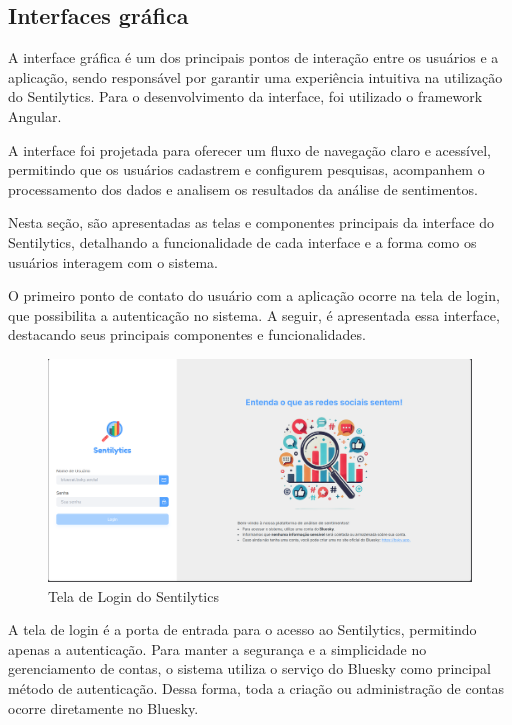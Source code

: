 \documentclass[
	12pt,				%
	oneside,			%
	a4paper,			%
	english,			%
	french,				%
	spanish,			%
	brazil				%
	]{abntex2}
\begin{document}
\hypertarget{interfaces-gruxe1fica}{%
\subsection{Interfaces gráfica}\label{interfaces-gruxe1fica}}

A interface gráfica é um dos principais pontos de interação entre os
usuários e a aplicação, sendo responsável por garantir uma experiência
intuitiva na utilização do Sentilytics. Para o desenvolvimento da
interface, foi utilizado o framework Angular.

A interface foi projetada para oferecer um fluxo de navegação claro e
acessível, permitindo que os usuários cadastrem e configurem pesquisas,
acompanhem o processamento dos dados e analisem os resultados da análise
de sentimentos.

Nesta seção, são apresentadas as telas e componentes principais da
interface do Sentilytics, detalhando a funcionalidade de cada interface
e a forma como os usuários interagem com o sistema.

O primeiro ponto de contato do usuário com a aplicação ocorre na tela de
login, que possibilita a autenticação no sistema. A seguir, é
apresentada essa interface, destacando seus principais componentes e
funcionalidades.

\begin{figure}[htbp]
\hypertarget{tela_login}{%
\caption{Tela de Login do Sentilytics}\label{tela_login}
\begin{center}
\includegraphics[scale=0.2]{imagens/sentilytics/interface-grafica/tela-login.png}
\end{center}
}
\end{figure}

A tela de login é a porta de entrada para o acesso ao Sentilytics,
permitindo apenas a autenticação. Para manter a segurança e a
simplicidade no gerenciamento de contas, o sistema utiliza o serviço do
Bluesky como principal método de autenticação. Dessa forma, toda a
criação ou administração de contas ocorre diretamente no Bluesky.
\end{document}
